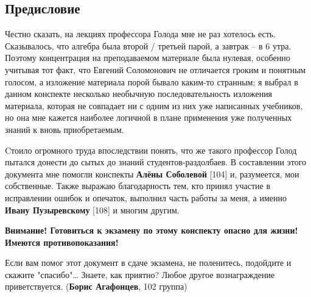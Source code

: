 \subsection*{Предисловие}
 
 Честно сказать, на лекциях профессора Голода мне не раз хотелось
 есть. Сказывалось, что алгебра была второй / третьей парой, а
 завтрак -- в 6 утра. Поэтому концентрация на преподаваемом материале
 была нулевая, особенно учитывая тот факт, что Евгений Соломонович не
 отличается гроким и понятным голосом, а изложение материала порой
 бывало каким-то странным; я выбрал в данном конспекте несколько
 необычную последовательность изложения материала, которая не
 совпадает ни с одним из них уже написанных учебников, но она мне
 кажется наиболее логичной в плане применения уже полученных знаний к
 вновь приобретаемым.
 
 Cтоило огромного труда впоследствии понять, что же такого профессор
 Голод пытался донести до сытых до знаний студентов-раздолбаев. В
 составлении этого документа мне помогли конспекты {\bfseries Алёны
 Соболевой} [104] и, разумеется, мои собственные. Также выражаю
 благодарность тем, кто принял участие в исправлении ошибок и
 опечаток, выполнил часть работы за меня, а именно {\bfseries Ивану
 Пузыревскому} [108] и многим другим.



\begin{petit}

{\color{red}\bf Внимание! Готовиться к экзамену по этому конспекту опасно
  для жизни! Имеются противопоказания!}

\end{petit} 

\begin{petit}
Если вам помог этот документ в сдаче экзамена, не поленитесь, подойдите и скажите "спасибо"\ldots
Знаете, как приятно? Любое другое вознаграждение приветствуется.
({\bfseries Борис Агафонцев}, 102 группа)
\end{petit}
 
 

